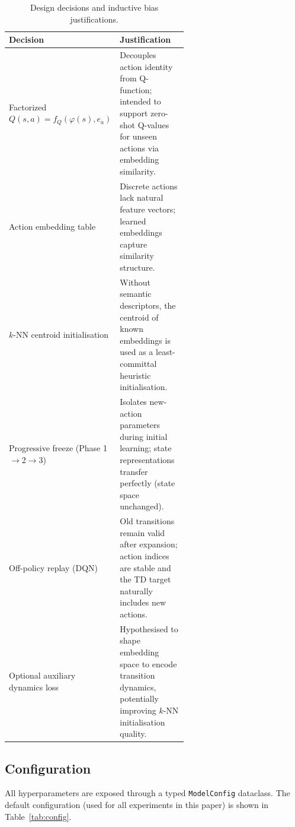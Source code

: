 \documentclass{article}
\begin{document}
\begin{table}[h]
  \centering
  \caption{Design decisions and inductive bias justifications.}
  \label{tab:design}
  \begin{tabular}{lp{0.6\linewidth}}
    \toprule
    \textbf{Decision} & \textbf{Justification} \\
    \midrule
    Factorized $Q(s,a) = f_Q(\varphi(s), e_a)$ &
    Decouples action identity from Q-function; intended to support zero-shot Q-values for unseen actions via embedding similarity. \\
    \addlinespace
    Action embedding table &
    Discrete actions lack natural feature vectors; learned embeddings capture similarity structure. \\
    \addlinespace
    $k$-NN centroid initialisation &
    Without semantic descriptors, the centroid of known embeddings is used as a least-committal heuristic initialisation. \\
    \addlinespace
    Progressive freeze (Phase 1$\to$2$\to$3) &
    Isolates new-action parameters during initial learning; state representations transfer perfectly (state space unchanged). \\
    \addlinespace
    Off-policy replay (DQN) &
    Old transitions remain valid after expansion; action indices are stable and the TD target naturally includes new actions. \\
    \addlinespace
    Optional auxiliary dynamics loss &
    Hypothesised to shape embedding space to encode transition dynamics, potentially improving $k$-NN initialisation quality. \\
    \bottomrule
  \end{tabular}
\end{table}

\subsection{Configuration}

All hyperparameters are exposed through a typed \texttt{ModelConfig} dataclass. The default configuration (used for all experiments in this paper) is shown in Table~\ref{tab:config}.
\end{document}

